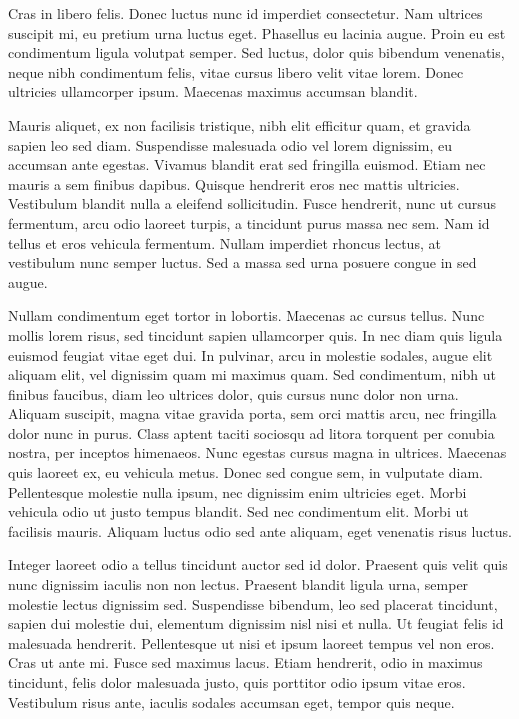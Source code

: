 Cras in libero felis. Donec luctus nunc id imperdiet consectetur. Nam ultrices suscipit mi, eu pretium urna luctus eget. Phasellus eu lacinia augue. Proin eu est condimentum ligula volutpat semper. Sed luctus, dolor quis bibendum venenatis, neque nibh condimentum felis, vitae cursus libero velit vitae lorem. Donec ultricies ullamcorper ipsum. Maecenas maximus accumsan blandit.

Mauris aliquet, ex non facilisis tristique, nibh elit efficitur quam, et gravida sapien leo sed diam. Suspendisse malesuada odio vel lorem dignissim, eu accumsan ante egestas. Vivamus blandit erat sed fringilla euismod. Etiam nec mauris a sem finibus dapibus. Quisque hendrerit eros nec mattis ultricies. Vestibulum blandit nulla a eleifend sollicitudin. Fusce hendrerit, nunc ut cursus fermentum, arcu odio laoreet turpis, a tincidunt purus massa nec sem. Nam id tellus et eros vehicula fermentum. Nullam imperdiet rhoncus lectus, at vestibulum nunc semper luctus. Sed a massa sed urna posuere congue in sed augue.

Nullam condimentum eget tortor in lobortis. Maecenas ac cursus tellus. Nunc mollis lorem risus, sed tincidunt sapien ullamcorper quis. In nec diam quis ligula euismod feugiat vitae eget dui. In pulvinar, arcu in molestie sodales, augue elit aliquam elit, vel dignissim quam mi maximus quam. Sed condimentum, nibh ut finibus faucibus, diam leo ultrices dolor, quis cursus nunc dolor non urna. Aliquam suscipit, magna vitae gravida porta, sem orci mattis arcu, nec fringilla dolor nunc in purus. Class aptent taciti sociosqu ad litora torquent per conubia nostra, per inceptos himenaeos. Nunc egestas cursus magna in ultrices. Maecenas quis laoreet ex, eu vehicula metus. Donec sed congue sem, in vulputate diam. Pellentesque molestie nulla ipsum, nec dignissim enim ultricies eget. Morbi vehicula odio ut justo tempus blandit. Sed nec condimentum elit. Morbi ut facilisis mauris. Aliquam luctus odio sed ante aliquam, eget venenatis risus luctus.

Integer laoreet odio a tellus tincidunt auctor sed id dolor. Praesent quis velit quis nunc dignissim iaculis non non lectus. Praesent blandit ligula urna, semper molestie lectus dignissim sed. Suspendisse bibendum, leo sed placerat tincidunt, sapien dui molestie dui, elementum dignissim nisl nisi et nulla. Ut feugiat felis id malesuada hendrerit. Pellentesque ut nisi et ipsum laoreet tempus vel non eros. Cras ut ante mi. Fusce sed maximus lacus. Etiam hendrerit, odio in maximus tincidunt, felis dolor malesuada justo, quis porttitor odio ipsum vitae eros. Vestibulum risus ante, iaculis sodales accumsan eget, tempor quis neque.

